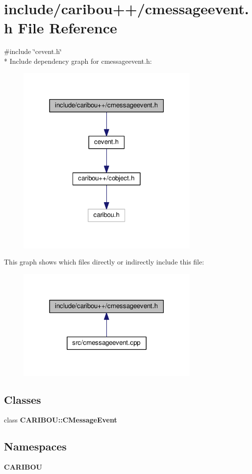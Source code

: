 \section{include/caribou++/cmessageevent.h File Reference}
\label{cmessageevent_8h}
{\ttfamily \#include \char`\"{}cevent.\-h\char`\"{}}\\*
Include dependency graph for cmessageevent.\-h\-:\nopagebreak
\begin{figure}[H]
\begin{center}
\leavevmode
\includegraphics[width=254pt]{cmessageevent_8h__incl}
\end{center}
\end{figure}
This graph shows which files directly or indirectly include this file\-:\nopagebreak
\begin{figure}[H]
\begin{center}
\leavevmode
\includegraphics[width=254pt]{cmessageevent_8h__dep__incl}
\end{center}
\end{figure}
\subsection*{Classes}
\begin{DoxyCompactItemize}
\item 
class {\bf C\-A\-R\-I\-B\-O\-U\-::\-C\-Message\-Event}
\end{DoxyCompactItemize}
\subsection*{Namespaces}
\begin{DoxyCompactItemize}
\item 
{\bf C\-A\-R\-I\-B\-O\-U}
\end{DoxyCompactItemize}
